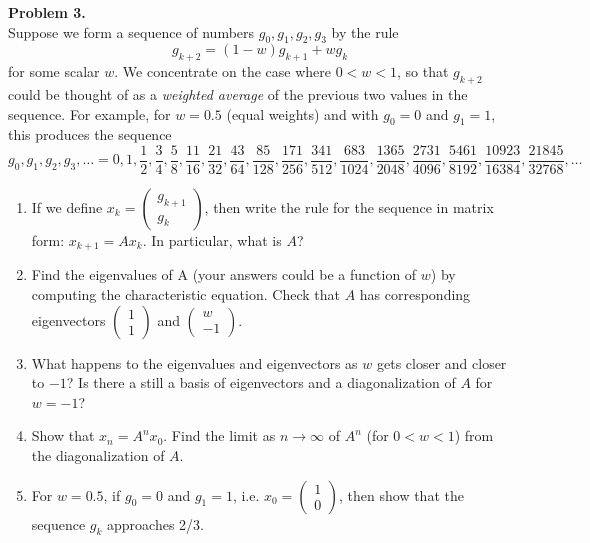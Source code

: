 \documentclass[11pt]{article}
\begin{document}
\noindent \textbf{Problem 3.}\\
Suppose we form a sequence of numbers $g_0,g_1,g_2,g_3$ by the rule
$$ g_{k+2} = (1-w) g_{k+1} + w g_k $$
for some scalar $w$.  We concentrate on the case where $0 < w < 1$, so that $g_{k+2}$ could be thought of as a \emph{weighted average} of the previous two values in the sequence.  For example, for $w = 0.5$ (equal weights) and with $g_0=0$ and $g_1 = 1$, this produces the sequence
$$ g_0,g_1,g_2,g_3,\ldots = 0, 1, \frac{1}{2}, \frac{3}{4}, \frac{5}{8}, \frac{11}{16}, \frac{21}{32}, \frac{43}{64}, \frac{85}{128}, \frac{171}{256}, \frac{341}{512}, \frac{683}{1024}, \frac{1365}{2048}, \frac{2731}{4096}, \frac{5461}{8192}, \frac{10923}{16384}, \frac{21845}{32768}, \ldots $$
\begin{enumerate}
\item If we define $x_k = \begin{pmatrix} g_{k+1} \\ g_k \end{pmatrix}$, then write the rule for the sequence in matrix form: $x_{k+1} = A x_k$.  In particular, what is $A$?
\item Find the eigenvalues of A (your answers could be a function of $w$) by computing the characteristic equation. Check that $A$ has corresponding eigenvectors $\begin{pmatrix} 1 \\ 1 \end{pmatrix}$ and $\begin{pmatrix} w \\ -1 \end{pmatrix}$.
\item What happens to the eigenvalues and eigenvectors as $w$ gets closer and closer to $-1$?  Is there a still a basis of eigenvectors and a diagonalization of $A$ for $w=-1$?
\item  Show that $x_n = A^n x_0$. Find the limit as $n\to\infty$ of $A^n$ (for $0 < w < 1$) from the diagonalization of $A$. 
\item For $w=0.5$, if $g_0 = 0$ and $g_1 = 1$, i.e. $x_0 = \begin{pmatrix} 1 \\ 0 \end{pmatrix}$, then show that the sequence $g_k$ approaches 2/3.
\end{enumerate} 
\end{document}
